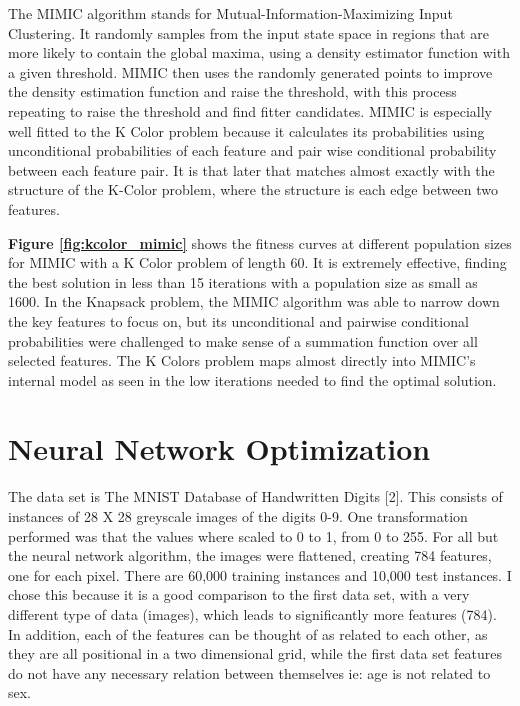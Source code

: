 \documentclass[letterpaper]{article} %
\begin{document}
The MIMIC algorithm stands for Mutual-Information-Maximizing Input Clustering.  It randomly samples from the input state space in regions that are more likely to contain the global maxima, using a density estimator function with a given threshold.  MIMIC then uses the randomly generated points to improve the density estimation function and raise the threshold, with this process repeating to raise the threshold and find fitter candidates.  MIMIC is especially well fitted to the K Color problem because  it calculates its probabilities using unconditional probabilities of each feature and pair wise conditional probability between each feature pair.  It is that later that matches almost exactly with the structure of the K-Color problem, where the structure is each edge between two features.  

\textbf{Figure \ref{fig:kcolor_mimic}} shows the fitness curves at different population sizes for MIMIC with a K Color problem of length 60.  It is extremely effective, finding the best solution in less than 15 iterations with a population size as small as 1600.  In the Knapsack problem, the MIMIC algorithm was able to narrow down the key features to focus on, but its unconditional and pairwise conditional probabilities were challenged to make sense of a summation function over all selected features. The K Colors problem maps almost directly into MIMIC's internal model as seen in the low iterations needed to find the optimal solution. 

\section{Neural Network Optimization}

The data set is The MNIST Database of Handwritten Digits [2].  This consists of instances of 28 X 28 greyscale images of the digits 0-9.  One transformation performed was that the values where scaled to 0 to 1, from 0 to 255.  For all but the neural network algorithm,  the images were flattened, creating 784 features, one for each pixel.  There are 60,000 training instances and 10,000 test instances.  I chose this because it is a good comparison to the first data set, with a very different type of data (images), which leads to significantly more features (784).  In addition, each of the features can be thought of as related to each other, as they are all positional in a two dimensional grid, while the first data set features do not have any necessary relation between themselves ie:  age is not related to sex.  
\end{document}
